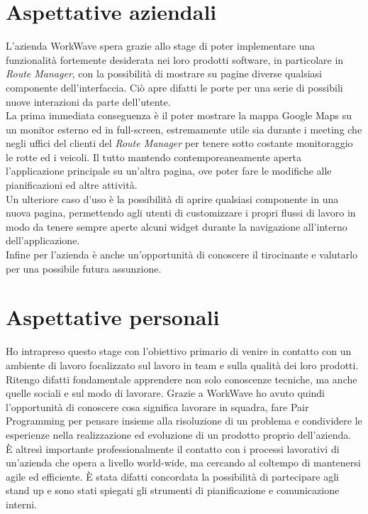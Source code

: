 \section{Aspettative aziendali}

L'azienda WorkWave spera grazie allo stage di poter implementare una funzionalità fortemente desiderata nei loro prodotti software, in particolare in \textit{Route Manager}, con la possibilità di mostrare su pagine diverse qualsiasi componente dell'interfaccia. Ciò apre difatti le porte per una serie di possibili nuove interazioni da parte dell'utente. \\

La prima immediata conseguenza è il poter mostrare la mappa Google Maps su un monitor esterno ed in full-screen, estremamente utile sia durante i meeting che negli uffici del clienti del \textit{Route Manager} per tenere sotto costante monitoraggio le rotte ed i veicoli. Il tutto mantendo contemporeaneamente aperta l'applicazione principale su un'altra pagina, ove poter fare le modifiche alle pianificazioni ed altre attività. \\

Un ulteriore caso d'uso è la possibilità di aprire qualsiasi componente in una nuova pagina, permettendo agli utenti di customizzare i propri flussi di lavoro in modo da tenere sempre aperte alcuni widget durante la navigazione all'interno dell'applicazione. \\

Infine per l'azienda è anche un'opportunità di conoscere il tirocinante e valutarlo per una possibile futura assunzione.

\section{Aspettative personali}

Ho intrapreso questo stage con l'obiettivo primario di venire in contatto con un ambiente di lavoro focalizzato sul lavoro in team e sulla qualità dei loro prodotti. Ritengo difatti fondamentale apprendere non solo conoscenze tecniche, ma anche quelle sociali e sul modo di lavorare. Grazie a WorkWave ho avuto quindi l'opportunità di conoscere cosa significa lavorare in squadra, fare \gls{Pair Programming} per pensare insieme alla risoluzione di un problema e condividere le esperienze nella realizzazione ed evoluzione di un prodotto proprio dell'azienda. \\

È altresì importante professionalmente il contatto con i processi lavorativi di un'azienda che opera a livello world-wide, ma cercando al coltempo di mantenersi agile ed efficiente. È stata difatti concordata la possibilità di partecipare agli \gls{stand up} e sono stati spiegati gli strumenti di pianificazione e comunicazione interni. \\

